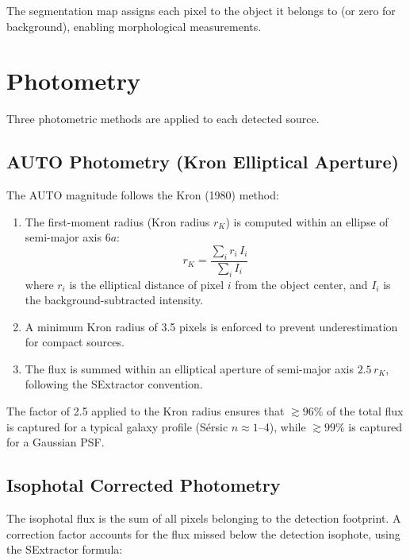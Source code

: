 \documentclass[11pt,fleqn]{book}
\begin{document}
The segmentation map assigns each pixel to the object it belongs to (or zero for background), enabling morphological measurements.


\section{Photometry}

Three photometric methods are applied to each detected source.

\subsection{AUTO Photometry (Kron Elliptical Aperture)}

The AUTO magnitude follows the Kron (1980) method:

\begin{enumerate}[leftmargin=2em]
  \item The first-moment radius (Kron radius $r_K$) is computed within an ellipse of semi-major axis $6a$:
  \begin{equation}
    r_K = \frac{\sum_i r_i \, I_i}{\sum_i I_i}
  \end{equation}
  where $r_i$ is the elliptical distance of pixel $i$ from the object center, and $I_i$ is the background-subtracted intensity.
  \item A minimum Kron radius of 3.5 pixels is enforced to prevent underestimation for compact sources.
  \item The flux is summed within an elliptical aperture of semi-major axis $2.5 \, r_K$, following the SExtractor convention.
\end{enumerate}

\begin{infobox}
The factor of 2.5 applied to the Kron radius ensures that ${\gtrsim}96\%$ of the total flux is captured for a typical galaxy profile (S\'{e}rsic $n \approx 1$--4), while ${\gtrsim}99\%$ is captured for a Gaussian PSF.
\end{infobox}

\subsection{Isophotal Corrected Photometry}

The isophotal flux is the sum of all pixels belonging to the detection footprint. A correction factor accounts for the flux missed below the detection isophote, using the SExtractor formula:
\end{document}
